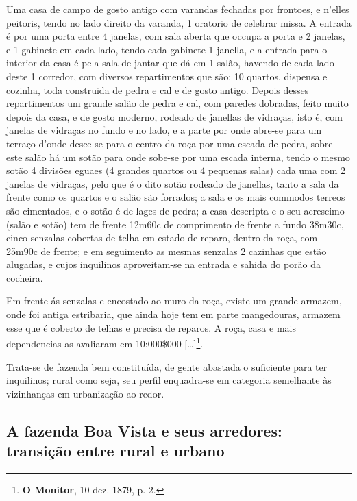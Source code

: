 \begin{citacao}
Uma casa de campo de gosto antigo com varandas fechadas por frontoes, e n'elles peitoris, tendo no lado direito da varanda, 1 oratorio de celebrar missa. A entrada é por uma porta entre 4 janelas, com sala aberta que occupa a porta e 2 janelas, e 1 gabinete em cada lado, tendo cada gabinete 1 janella, e a entrada para o interior da casa é pela sala de jantar que dá em 1 salão, havendo de cada lado deste 1 corredor, com diversos repartimentos que são: 10 quartos, dispensa e cozinha, toda construida de pedra e cal e de gosto antigo. Depois desses repartimentos um grande salão de pedra e cal, com paredes dobradas, feito muito depois da casa, e de gosto moderno, rodeado de janellas de vidraças, isto é, com janelas de vidraças no fundo e no lado, e a parte por onde abre-se para um terraço d'onde desce-se para o centro da roça por uma escada de pedra, sobre este salão há um sotão para onde sobe-se por uma escada interna, tendo o mesmo sotão 4 divisões eguaes (4 grandes quartos ou 4 pequenas salas) cada uma com 2 janelas de vidraças, pelo que é o dito sotão rodeado de janellas, tanto a sala da frente como os quartos e o salão são forrados; a sala e os mais commodos terreos são cimentados, e o sotão é de lages de pedra; a casa descripta e o seu acrescimo (salão e sotão) tem de frente 12m60c de comprimento de frente a fundo 38m30c, cinco senzalas cobertas de telha em estado de reparo, dentro da roça, com 25m90c de frente; e em seguimento as mesmas senzalas 2 cazinhas que estão alugadas, e cujos inquilinos aproveitam-se na entrada e sahida do porão da cocheira.

Em frente ás senzalas e encostado ao muro da roça, existe um grande armazem, onde foi antiga estribaria, que ainda hoje tem em parte mangedouras, armazem esse que é coberto de telhas e precisa de reparos. A roça, casa e mais dependencias as avaliaram em 10:000\$000 [\dots]\footnote{\textbf{O Monitor}, 10 dez. 1879, p. 2.}.
\end{citacao}

Trata-se de fazenda bem constituída, de gente abastada o suficiente para ter inquilinos; rural como seja, seu perfil enquadra-se em categoria semelhante às vizinhanças em urbanização ao redor.

\subsection{A fazenda Boa Vista e seus arredores: transição entre rural e urbano}\label{subsec:boavista}

